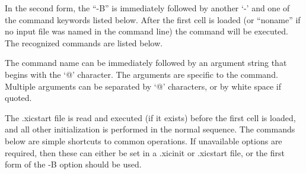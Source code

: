 In the second form, the ``{\vt -B}'' is immediately followed by
another `{\vt -}' and one of the command keywords listed below.  After the
first cell is loaded (or ``noname'' if no input file was named in the
command line) the command will be executed.  The recognized commands
are listed below.

The command name can be immediately followed by an argument string that
begins with the `{\vt @}' character.  The arguments are specific to the
command.  Multiple arguments can be separated by `{\vt @}' characters,
or by white space if quoted.

The {\vt .xicstart} file is read and executed (if it exists) before
the first cell is loaded, and all other initialization is performed in
the normal sequence.  The commands below are simple shortcuts to
common operations.  If unavailable options are required, then these
can either be set in a {\vt .xicinit} or {\vt .xicstart} file, or the
first form of the {\vt -B} option should be used.

